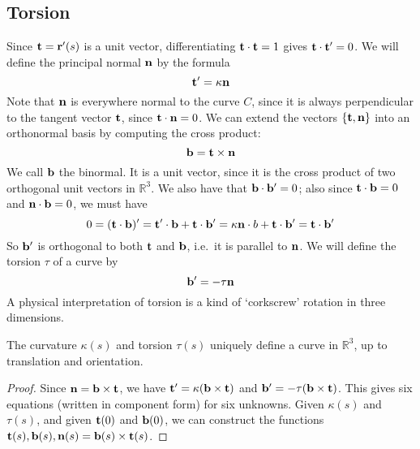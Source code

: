 \subsection{Torsion}
Since \(\vb t = \vb r'(s)\) is a unit vector, differentiating \(\vb t \cdot \vb t = 1\) gives \(\vb t \cdot \vb t' = 0\). We will define the principal normal \(\vb n\) by the formula
\[ \vb t' = \kappa \vb n \]
Note that \(\vb n\) is everywhere normal to the curve \(C\), since it is always perpendicular to the tangent vector \(\vb t\), since \(\vb t \cdot \vb n = 0\). We can extend the vectors \(\{ \vb t, \vb n \}\) into an orthonormal basis by computing the cross product:
\[ \vb b = \vb t \times \vb n \]
We call \(\vb b\) the binormal. It is a unit vector, since it is the cross product of two orthogonal unit vectors in \(\mathbb R^3\). We also have that \(\vb b \cdot \vb b' = 0\); also since \(\vb t \cdot \vb b = 0\) and \(\vb n \cdot \vb b = 0\), we must have
\[ 0 = (\vb t \cdot \vb b)' = \vb t' \cdot \vb b + \vb t \cdot \vb b' = \kappa \vb n \cdot b + \vb t \cdot \vb b' = \vb t \cdot \vb b' \]
So \(\vb b'\) is orthogonal to both \(\vb t\) and \(\vb b\), i.e.\ it is parallel to \(\vb n\). We will define the torsion \(\tau\) of a curve by
\[ \vb b' = -\tau \vb n \]
A physical interpretation of torsion is a kind of `corkscrew' rotation in three dimensions.

\begin{proposition}
	The curvature \(\kappa(s)\) and torsion \(\tau(s)\) uniquely define a curve in \(\mathbb R^3\), up to translation and orientation.
\end{proposition}
\begin{proof}
	Since \(\vb n = \vb b \times \vb t\), we have \(\vb t' = \kappa(\vb b \times \vb t)\) and \(\vb b' = -\tau(\vb b \times \vb t)\). This gives six equations (written in component form) for six unknowns. Given \(\kappa(s)\) and \(\tau(s)\), and given \(\vb t(0)\) and \(\vb b(0)\), we can construct the functions \(\vb t(s), \vb b(s), \vb n(s) = \vb b(s) \times \vb t(s)\).
\end{proof}

